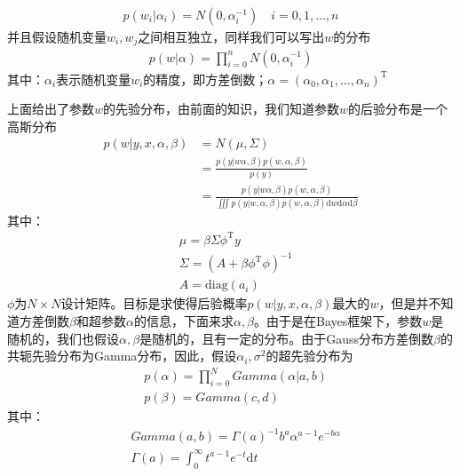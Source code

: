         \begin{align*}
        p(w_i|\alpha_i) = N(0,\alpha_i^{-1})\quad i = 0, 1,\dots,n
        \end{align*}
        并且假设随机变量$w_i,w_j$之间相互独立，同样我们可以写出$w$的分布
        \begin{align*}
        p(w|\alpha) = \prod _{i=0}^n N(0,\alpha_i^{-1})
        \end{align*}
        其中：$\alpha_i$表示随机变量$w_i$的精度，即方差倒数；$\alpha = (\alpha_0,\alpha_1,\dots,\alpha_n)^\mathrm{T}$
        \par
        上面给出了参数$w$的先验分布，由前面的知识，我们知道参数$w$的后验分布是一个高斯分布
        \begin{align*}
        p(w|y,x,\alpha,\beta) &= N(\mu,\Sigma) \\
        &= \frac{p(y|w \alpha,\beta)p(w,\alpha,\beta)}{p(y)}\\
        &= \frac{p(y|w \alpha,\beta)p(w,\alpha,\beta)}{\iiint p (y|w,\alpha,\beta)p(w,\alpha,\beta) \mathrm{d}w\mathrm{d}\alpha\mathrm{d}\beta}
        \end{align*}
        其中：
        \begin{align*}
        &\mu = \beta \Sigma \phi^\mathrm{T}y\\
        &\Sigma = (A + \beta \phi^\mathrm{T}\phi)^{-1}\\
        &A = \mathrm{diag}(a_i)
        \end{align*}
        $\phi$为$N\times N$设计矩阵。目标是求使得后验概率$p(w|y,x,\alpha,\beta)$最大的$w$，但是并不知道方差倒数$\beta$和超参数$\alpha$的信息，下面来求$\alpha,\beta$。由于是在Bayes框架下，参数$w$是随机的，我们也假设$\alpha,\beta$是随机的，且有一定的分布。由于Gauss分布方差倒数$\beta$的共轭先验分布为Gamma分布，因此，假设$\alpha_i,\sigma^2$的超先验分布为
        \begin{align*}
        &p(\alpha) = \prod_{i = 0}^N Gamma(\alpha|a,b) \\
        &p(\beta) = Gamma(c,d)
        \end{align*}
        其中：
        \begin{align*}
        &Gamma(a,b) = \Gamma(a)^{-1}b^a\alpha^{a-1}e^{-b\alpha} \\
        &\Gamma(a) = \int_0^\infty t^{a-1}e^{-t}\mathrm{d}t
        \end{align*}
